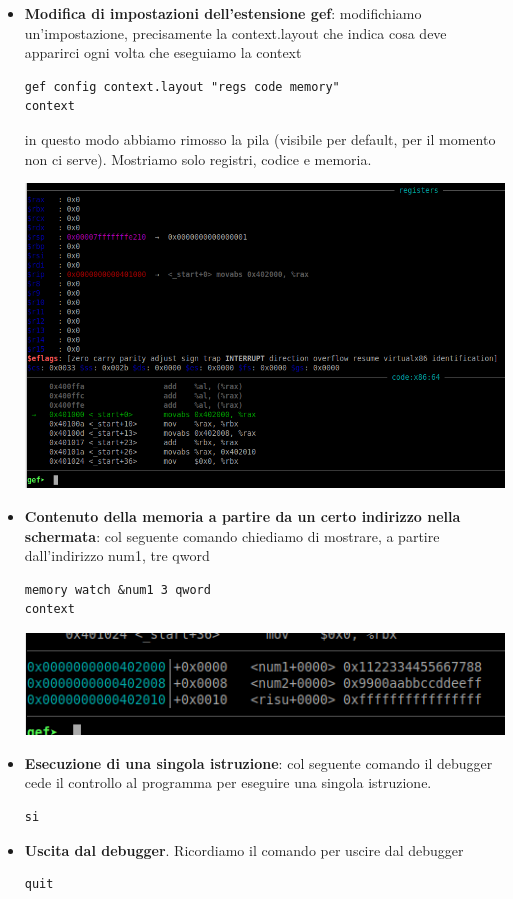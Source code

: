 \documentclass[11pt]{report}
\theoremstyle{definition}
\begin{document}
\begin{itemize}
\begin{center}
\end{center}
\item \textbf{Modifica di impostazioni dell'estensione gef}: modifichiamo un'impostazione, precisamente la context.layout che indica cosa deve apparirci ogni volta che eseguiamo la context
\begin{verbatim}
gef config context.layout "regs code memory"
context
\end{verbatim}
in questo modo abbiamo rimosso la pila (visibile per default, per il momento non ci serve). Mostriamo solo registri, codice e memoria.
\begin{center}
	\includegraphics[scale=.9]{img/147.PNG}
\end{center}
\item \textbf{Contenuto della memoria a partire da un certo indirizzo nella schermata}: col seguente comando chiediamo di mostrare, a partire dall'indirizzo num1, tre qword
\begin{verbatim}
memory watch &num1 3 qword
context
\end{verbatim}
\begin{center}
\includegraphics[scale=.9]{img/148.PNG}
\end{center}
\item \textbf{Esecuzione di una singola istruzione}: col seguente comando 
il debugger cede il controllo al programma per eseguire una singola istruzione.
\begin{verbatim}
si
\end{verbatim} 
\item \textbf{Uscita dal debugger}. Ricordiamo il comando per uscire dal debugger
\begin{verbatim}
quit
\end{verbatim}
\end{itemize}
\end{document}
